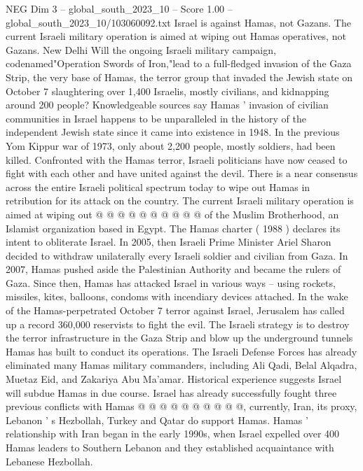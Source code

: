 \begin{textsample}{NEG Dim 3 – global\_south\_2023\_10 – Score 1.00 – global\_south\_2023\_10/103060092.txt}  \label{ex:f3_neg_028}
Israel is against Hamas, not Gazans.
The current Israeli military operation is aimed at wiping out Hamas operatives, not Gazans.
New Delhi Will the ongoing Israeli military campaign, codenamed"Operation Swords of Iron,"lead to a full-fledged invasion of the Gaza Strip, the very base of Hamas, the terror group that invaded the Jewish state on October 7 slaughtering over 1,400 Israelis, mostly civilians, and kidnapping around 200 people?
Knowledgeable sources say Hamas ' invasion of civilian communities in Israel happens to be unparalleled in the history of the independent Jewish state since it came into existence in 1948.
In the previous Yom Kippur war of 1973, only about 2,200 people, mostly soldiers, had been killed.
Confronted with the Hamas terror, Israeli politicians have now ceased to fight with each other and have united against the devil.
There is a near consensus across the entire Israeli political spectrum today to wipe out Hamas in retribution for its attack on the country.
The current Israeli military operation is aimed at wiping out @ @ @ @ @ @ @ @ @ @ of the Muslim Brotherhood, an Islamist organization based in Egypt.
The Hamas charter ( 1988 ) declares its intent to obliterate Israel.
In 2005, then Israeli Prime Minister Ariel Sharon decided to withdraw unilaterally every Israeli soldier and civilian from Gaza.
In 2007, Hamas pushed aside the Palestinian Authority and became the rulers of Gaza.
Since then, Hamas has attacked Israel in various ways -- using rockets, missiles, kites, balloons, condoms with incendiary devices attached.
In the wake of the Hamas-perpetrated October 7 terror against Israel, Jerusalem has called up a record 360,000 reservists to fight the evil.
The Israeli strategy is to destroy the terror infrastructure in the Gaza Strip and blow up the underground tunnels Hamas has built to conduct its operations.
The Israeli Defense Forces has already eliminated many Hamas military commanders, including Ali Qadi, Belal Alqadra, Muetaz Eid, and Zakariya Abu Ma'amar.
Historical experience suggests Israel will subdue Hamas in due course.
Israel has already successfully fought three previous conflicts with Hamas @ @ @ @ @ @ @ @ @ @, currently, Iran, its proxy, Lebanon ' s Hezbollah, Turkey and Qatar do support Hamas.
Hamas ' relationship with Iran began in the early 1990s, when Israel expelled over 400 Hamas leaders to Southern Lebanon and they established acquaintance with Lebanese Hezbollah.

\end{textsample}
